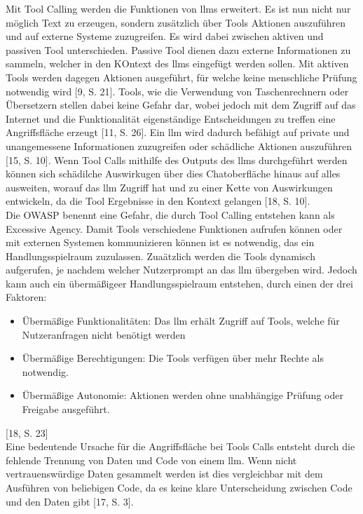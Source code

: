 Mit Tool Calling werden die Funktionen von \ac{llm}s erweitert. Es ist nun nicht nur möglich Text zu erzeugen, sondern zusätzlich über Tools Aktionen auszuführen 
und auf externe Systeme zuzugreifen. Es wird dabei zwischen aktiven und passiven Tool unterschieden. Passive Tool dienen dazu externe Informationen zu sammeln, 
welcher in den KOntext des \ac{llm}s eingefügt werden sollen. Mit aktiven Tools werden dagegen Aktionen ausgeführt, für welche keine menschliche Prüfung notwendig
wird [9, S. 21]. Tools, wie die Verwendung von Taschenrechnern oder Übersetzern stellen dabei keine Gefahr dar, wobei jedoch mit dem Zugriff auf das Internet
und die Funktionalität eigenständige Entscheidungen zu treffen eine Angriffsfläche erzeugt [11, S. 26]. Ein \ac{llm} wird dadurch befähigt auf private und 
unangemessene Informationen zuzugreifen oder schädliche Aktionen auszuführen [15, S. 10]. Wenn Tool Calls mithilfe des Outputs des \ac{llm}s durchgeführt werden können 
sich schädilche Auswirkugen über dies Chatoberfläche hinaus auf alles ausweiten, worauf das \ac{llm} Zugriff hat und zu einer Kette von Auswirkungen entwickeln, da
die Tool Ergebnisse in den Kontext gelangen [18, S. 10]. \\
Die OWASP benennt eine Gefahr, die durch Tool Calling entstehen kann als Excessive Agency. Damit Tools verschiedene Funktionen aufrufen können oder mit externen Systemen 
kommunizieren können ist es notwendig, das ein Handlungsspielraum zuzulassen. Zuaätzlich werden die Tools dynamisch aufgerufen, je nachdem welcher Nutzerprompt
an das \ac{llm} übergeben wird. Jedoch kann auch ein übermäßigeer Handlungsspielraum entstehen, durch einen der drei Faktoren:
\begin{itemize}
    \item Übermäßige Funktionalitäten: Das \ac{llm} erhält Zugriff auf Tools, welche für Nutzeranfragen nicht benötigt werden
    \item Übermäßige Berechtigungen: Die Tools verfügen über mehr Rechte als notwendig. 
    \item Übermäßige Autonomie: Aktionen werden ohne unabhängige Prüfung oder Freigabe ausgeführt.
\end{itemize} [18, S. 23] \\
Eine bedeutende Ursache für die Angriffsfläche bei Tools Calls entsteht durch die fehlende Trennung von Daten und Code von einem \ac{llm}. Wenn nicht vertrauenswürdige
Daten gesammelt werden ist dies vergleichbar mit dem Ausführen von beliebigen Code, da es keine klare Unterscheidung zwischen Code und den Daten gibt [17, S. 3].
